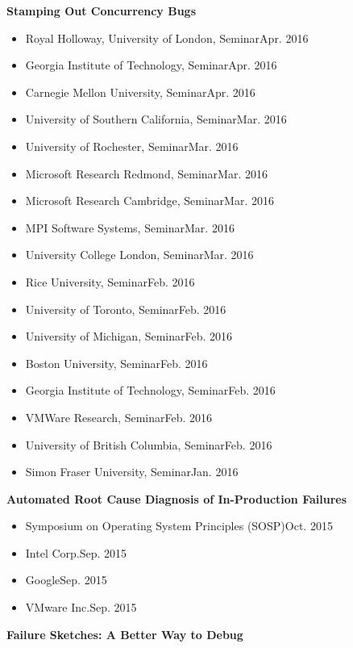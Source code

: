 \documentclass[10pt]{article}
\newcommand{\mysub}[3]{\textbf{#1} {#2} \hfill {\em #3}}
\begin{document}
\mysub{Stamping Out Concurrency Bugs}{}{} 
\vspace{-2mm}
\begin{itemize}
\setlength\itemsep{0em}
\item{Royal Holloway, University of London, Seminar}\hfill Apr. 2016
\item{Georgia Institute of Technology, Seminar}\hfill Apr. 2016
\item{Carnegie Mellon University, Seminar}\hfill Apr. 2016
\item{University of Southern California, Seminar}\hfill Mar. 2016
\item{University of Rochester, Seminar}\hfill Mar. 2016
\item{Microsoft Research Redmond, Seminar}\hfill Mar. 2016
\item{Microsoft Research Cambridge, Seminar}\hfill Mar. 2016
\item{MPI Software Systems, Seminar}\hfill Mar. 2016
\item{University College London, Seminar}\hfill Mar. 2016
\item{Rice University, Seminar}\hfill Feb. 2016
\item{University of Toronto, Seminar}\hfill Feb. 2016
\item{University of Michigan, Seminar}\hfill Feb. 2016
\item{Boston University, Seminar}\hfill Feb. 2016
\item{Georgia Institute of Technology, Seminar}\hfill Feb. 2016
\item{VMWare Research, Seminar}\hfill Feb. 2016
\item{University of British Columbia, Seminar}\hfill Feb. 2016
\item{Simon Fraser University, Seminar}\hfill Jan. 2016
\end{itemize}
\mysub{Automated Root Cause Diagnosis of In-Production Failures}{}{} 
\vspace{-2mm}
\begin{itemize}
\setlength\itemsep{0em}
\item{Symposium on Operating System Principles (SOSP)}\hfill Oct. 2015
\item{Intel Corp.}\hfill Sep. 2015
\item{Google}\hfill Sep. 2015
\item{VMware Inc.}\hfill Sep. 2015
\end{itemize}
\vspace{-2mm}
\mysub{Failure Sketches: A Better Way to Debug}{}{} 
\vspace{-2mm}
\end{document}
